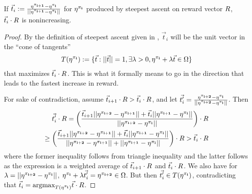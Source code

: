 \begin{proposition}%
If $\vec{t}_i := \frac{\mathbf{\eta^{\pi_{i+1}}}-\mathbf{\eta^{\pi_i}}}{||\mathbf{\eta^{\pi_{i+1}}}-\mathbf{\eta^{\pi_i}}||}$ for $\mathbf{\eta^{\pi_i}}$ produced by steepest ascent on reward vector $R$, $\vec{t}_i \cdot R$ is nonincreasing. 
\end{proposition}
\begin{proof}
By the definition of steepest ascent given in \cite{denel_steepest_1981}, $\vec{t}_i$ will be the unit vector in the \enquote{cone of tangents} $$T(\mathbf{\eta^{\pi_{i}}}) := \{\vec{t}: ||\vec{t}|| = 1, \exists \lambda > 0, \mathbf{\eta^{\pi_i}} + \lambda \vec{t} \in \Omega\}$$
that maximizes $\vec{t}_i \cdot R$. This is what it formally means to go in the direction that leads to the fastest increase in reward.

For sake of contradiction, assume $\vec{t}_{i+1} \cdot R>\vec{t}_{i}\cdot R$, and let $\vec{t_i'} = \frac{\mathbf{\eta^{\pi_{i+2}}}-\mathbf{\eta^{\pi_{i}}}}{||\mathbf{\eta^{\pi_{i+2}}}-\mathbf{\eta^{\pi_{i}}}||}$. Then
\begin{align*}
\vec{t_i'}\cdot R = \left(\frac{\vec{t}_{i+1}||\mathbf{\eta^{\pi_{i+2}}}-\mathbf{\eta^{\pi_{i+1}}}||+\vec{t}_{i}||\mathbf{\eta^{\pi_{i+1}}}-\mathbf{\eta^{\pi_{i}}}||}{||\mathbf{\eta^{\pi_{i+2}}}-\mathbf{\eta^{\pi_{i}}}||}\right) \cdot R\\ \geq \left(\frac{\vec{t}_{i+1}||\mathbf{\eta^{\pi_{i+2}}}-\mathbf{\eta^{\pi_{i+1}}}||+\vec{t}_{i}||\mathbf{\eta^{\pi_{i+1}}}-\mathbf{\eta^{\pi_{i}}}||}{||\mathbf{\eta^{\pi_{i+2}}}-\mathbf{\eta^{\pi_{i+1}}}||+||\mathbf{\eta^{\pi_{i+1}}}-\mathbf{\eta^{\pi_{i}}}||}\right) \cdot R > \vec{t}_{i}\cdot R
\end{align*}
where the former inequality follows from triangle inequality and the latter follows as the expression is a weighted average of $\vec{t}_{i+1} \cdot R$ and $\vec{t}_{i} \cdot R$. We also have for $\lambda = ||\mathbf{\eta^{\pi_{i+2}}}-\mathbf{\eta^{\pi_{i}}}||$, $\mathbf{\eta^{\pi_i}}+\lambda \vec{t_i'} = \mathbf{\eta^{\pi_{i+2}}} \in \Omega$. But then $\vec{t_i'} \in T(\mathbf{\eta^{\pi_{i}}})$, contradicting that $\vec{t}_{i} = \text{argmax}_{T(\mathbf{\eta^{\pi_{i}}})}\vec{t} \cdot R$.
\end{proof}

